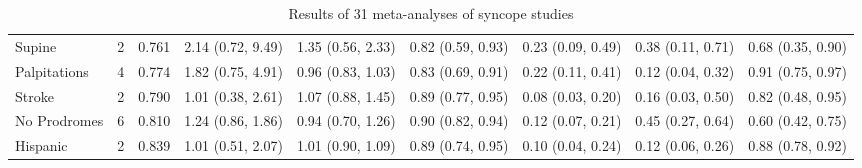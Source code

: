 \begin{table}[ht]
\begin{tabular}{lrrllllll}
  Supine &    2 & 0.761 & 2.14 (0.72, 9.49) & 1.35 (0.56, 2.33) & 0.82 (0.59, 0.93) & 0.23 (0.09, 0.49) & 0.38 (0.11, 0.71) & 0.68 (0.35, 0.90) \\ 
  Palpitations &    4 & 0.774 & 1.82 (0.75, 4.91) & 0.96 (0.83, 1.03) & 0.83 (0.69, 0.91) & 0.22 (0.11, 0.41) & 0.12 (0.04, 0.32) & 0.91 (0.75, 0.97) \\ 
  Stroke &    2 & 0.790 & 1.01 (0.38, 2.61) & 1.07 (0.88, 1.45) & 0.89 (0.77, 0.95) & 0.08 (0.03, 0.20) & 0.16 (0.03, 0.50) & 0.82 (0.48, 0.95) \\ 
  No Prodromes &    6 & 0.810 & 1.24 (0.86, 1.86) & 0.94 (0.70, 1.26) & 0.90 (0.82, 0.94) & 0.12 (0.07, 0.21) & 0.45 (0.27, 0.64) & 0.60 (0.42, 0.75) \\ 
  Hispanic &    2 & 0.839 & 1.01 (0.51, 2.07) & 1.01 (0.90, 1.09) & 0.89 (0.74, 0.95) & 0.10 (0.04, 0.24) & 0.12 (0.06, 0.26) & 0.88 (0.78, 0.92) \\ 
   \hline
\end{tabular}
\caption{Results of 31 meta-analyses of syncope studies} 
\end{table}

